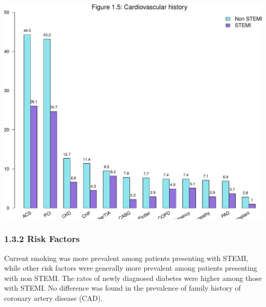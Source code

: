 \documentclass[
]{article}
\begin{document}
\includegraphics{ACSIS_2024_v1_pdf_files/figure-latex/unnamed-chunk-20-1.pdf}

\pagebreak

\subsubsection{1.3.2 Risk Factors}\label{risk-factors}

Current smoking was more prevalent among patients presenting with STEMI,
while other risk factors were generally more prevalent among patients
presenting with non STEMI. The rates of newly diagnosed diabetes were
higher among those with STEMI. No difference was found in the prevalence
of family history of coronary artery disease (CAD).

~
\end{document}
